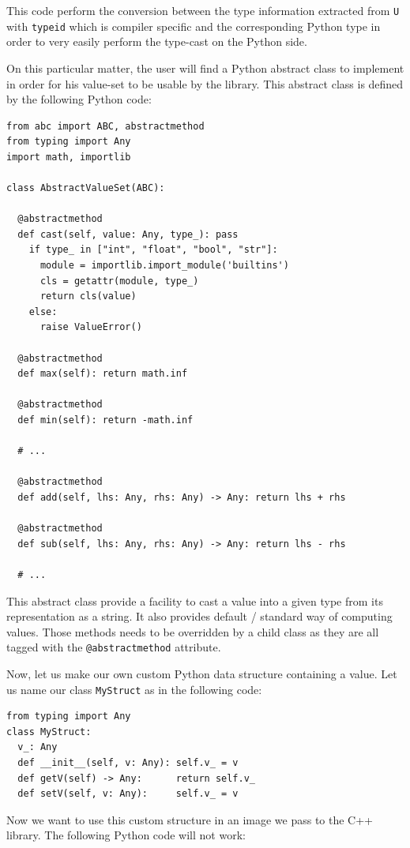This code perform the conversion between the type information extracted from \texttt{U} with \texttt{typeid} which is
compiler specific and the corresponding Python type in order to very easily perform the type-cast on the Python side.

On this particular matter, the user will find a Python abstract class to implement in order for his value-set to be
usable by the library. This abstract class is defined by the following Python code:

\begin{verbatim}
from abc import ABC, abstractmethod
from typing import Any
import math, importlib

class AbstractValueSet(ABC):

  @abstractmethod
  def cast(self, value: Any, type_): pass
    if type_ in ["int", "float", "bool", "str"]:
      module = importlib.import_module('builtins')
      cls = getattr(module, type_)
      return cls(value)
    else:
      raise ValueError()

  @abstractmethod
  def max(self): return math.inf

  @abstractmethod
  def min(self): return -math.inf

  # ...

  @abstractmethod
  def add(self, lhs: Any, rhs: Any) -> Any: return lhs + rhs

  @abstractmethod
  def sub(self, lhs: Any, rhs: Any) -> Any: return lhs - rhs

  # ...
\end{verbatim}

This abstract class provide a facility to cast a value into a given type from its representation as a string. It also
provides default / standard way of computing values. Those methods needs to be overridden by a child class as they are
all tagged with the \texttt{@abstractmethod} attribute.

Now, let us make our own custom Python data structure containing a value. Let us name our class \texttt{MyStruct} as in
the following code:

\begin{verbatim}
from typing import Any
class MyStruct:
  v_: Any
  def __init__(self, v: Any): self.v_ = v
  def getV(self) -> Any:      return self.v_
  def setV(self, v: Any):     self.v_ = v
\end{verbatim}

Now we want to use this custom structure in an image we pass to the C++ library. The following Python code will not
work:

